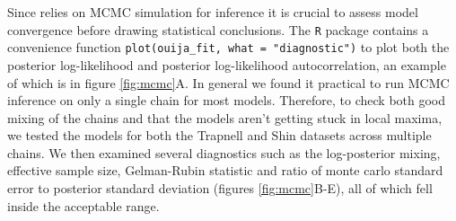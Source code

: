 Since \sname relies on MCMC simulation for inference it is crucial to assess model convergence before drawing statistical conclusions. The \sname \texttt{R} package contains a convenience function \texttt{plot(ouija\_fit, what = "diagnostic")} to plot both the posterior log-likelihood and posterior log-likelihood autocorrelation, an example of which is in figure \ref{fig:mcmc}A. In general we found it practical to run MCMC inference on only a single chain for most models. Therefore, to check both good mixing of the chains and that the models aren't getting stuck in local maxima, we tested the models for both the Trapnell and Shin datasets across multiple chains. We then examined several diagnostics such as the log-posterior mixing, effective sample size, Gelman-Rubin statistic and ratio of monte carlo standard error to posterior standard deviation (figures \ref{fig:mcmc}B-E), all of which fell inside the acceptable range. 



